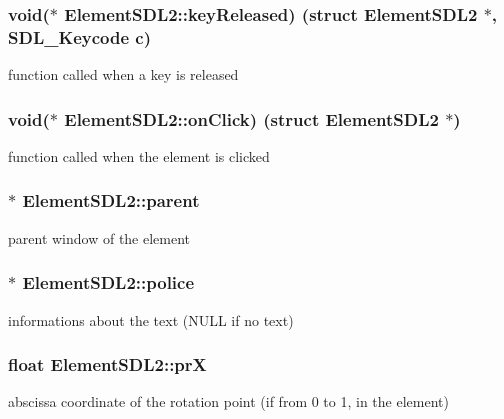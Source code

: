 \subsubsection[{\texorpdfstring{key\+Released}{keyReleased}}]{\setlength{\rightskip}{0pt plus 5cm}void($\ast$ Element\+S\+D\+L2\+::key\+Released) (struct {\bf Element\+S\+D\+L2} $\ast$, S\+D\+L\+\_\+\+Keycode c)}\hypertarget{structElementSDL2_a76ecf85adcb072db772a8351ea7e04ee}{}\label{structElementSDL2_a76ecf85adcb072db772a8351ea7e04ee}
function called when a key is released 
\subsubsection[{\texorpdfstring{on\+Click}{onClick}}]{\setlength{\rightskip}{0pt plus 5cm}void($\ast$ Element\+S\+D\+L2\+::on\+Click) (struct {\bf Element\+S\+D\+L2} $\ast$)}\hypertarget{structElementSDL2_ae56c022599e2e8acdda29fbb8af44942}{}\label{structElementSDL2_ae56c022599e2e8acdda29fbb8af44942}
function called when the element is clicked 
\subsubsection[{\texorpdfstring{parent}{parent}}]{$\ast$ Element\+S\+D\+L2\+::parent}\hypertarget{structElementSDL2_a9cd0b68349b49321423bec3136cf7e6e}{}\label{structElementSDL2_a9cd0b68349b49321423bec3136cf7e6e}
parent window of the element 
\subsubsection[{\texorpdfstring{police}{police}}]{$\ast$ Element\+S\+D\+L2\+::police}\hypertarget{structElementSDL2_a785d4fada0ba0ac6b5ce7a53c379f8cd}{}\label{structElementSDL2_a785d4fada0ba0ac6b5ce7a53c379f8cd}
informations about the text (N\+U\+LL if no text) 
\subsubsection[{\texorpdfstring{prX}{prX}}]{\setlength{\rightskip}{0pt plus 5cm}float Element\+S\+D\+L2\+::prX}\hypertarget{structElementSDL2_a9b522d7b8bf6b476d142fd0058aff66c}{}\label{structElementSDL2_a9b522d7b8bf6b476d142fd0058aff66c}
abscissa coordinate of the rotation point (if from 0 to 1, in the element) 
